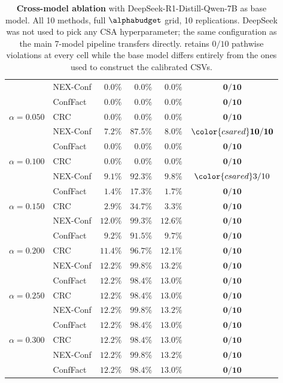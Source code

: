 \begin{table}[!ht]
\begin{tabular}{llrrrc}
 & NEX-Conf & $0.0\%$ & $0.0\%$ & $0.0\%$ & $\mathbf{0/10}$ \\
 & ConfFact & $0.0\%$ & $0.0\%$ & $0.0\%$ & $\mathbf{0/10}$ \\
\midrule
$\alpha=0.050$ & CRC & $0.0\%$ & $0.0\%$ & $0.0\%$ & $\mathbf{0/10}$ \\
 & NEX-Conf & $7.2\%$ & $87.5\%$ & $8.0\%$ & ${\color{csared}\mathbf{10/10}}$ \\
 & ConfFact & $0.0\%$ & $0.0\%$ & $0.0\%$ & $\mathbf{0/10}$ \\
\midrule
$\alpha=0.100$ & CRC & $0.0\%$ & $0.0\%$ & $0.0\%$ & $\mathbf{0/10}$ \\
 & NEX-Conf & $9.1\%$ & $92.3\%$ & $9.8\%$ & ${\color{csared}3/10}$ \\
 & ConfFact & $1.4\%$ & $17.3\%$ & $1.7\%$ & $\mathbf{0/10}$ \\
\midrule
$\alpha=0.150$ & CRC & $2.9\%$ & $34.7\%$ & $3.3\%$ & $\mathbf{0/10}$ \\
 & NEX-Conf & $12.0\%$ & $99.3\%$ & $12.6\%$ & $\mathbf{0/10}$ \\
 & ConfFact & $9.2\%$ & $91.5\%$ & $9.7\%$ & $\mathbf{0/10}$ \\
\midrule
$\alpha=0.200$ & CRC & $11.4\%$ & $96.7\%$ & $12.1\%$ & $\mathbf{0/10}$ \\
 & NEX-Conf & $12.2\%$ & $99.8\%$ & $13.2\%$ & $\mathbf{0/10}$ \\
 & ConfFact & $12.2\%$ & $98.4\%$ & $13.0\%$ & $\mathbf{0/10}$ \\
\midrule
$\alpha=0.250$ & CRC & $12.2\%$ & $98.4\%$ & $13.0\%$ & $\mathbf{0/10}$ \\
 & NEX-Conf & $12.2\%$ & $99.8\%$ & $13.2\%$ & $\mathbf{0/10}$ \\
 & ConfFact & $12.2\%$ & $98.4\%$ & $13.0\%$ & $\mathbf{0/10}$ \\
\midrule
$\alpha=0.300$ & CRC & $12.2\%$ & $98.4\%$ & $13.0\%$ & $\mathbf{0/10}$ \\
 & NEX-Conf & $12.2\%$ & $99.8\%$ & $13.2\%$ & $\mathbf{0/10}$ \\
 & ConfFact & $12.2\%$ & $98.4\%$ & $13.0\%$ & $\mathbf{0/10}$ \\
\midrule
\bottomrule
\end{tabular}
\caption{\textbf{Cross-model ablation} with DeepSeek-R1-Distill-Qwen-7B as base model. All 10 methods, full $\alphabudget$ grid, 10 replications. DeepSeek was not used to pick any CSA hyperparameter; the same configuration as the main 7-model pipeline transfers directly. \csa retains $0/10$ pathwise violations at every cell while the base model differs entirely from the ones used to construct the calibrated CSVs.}
\label{tab:cross-model-deepseek}
\end{table}
